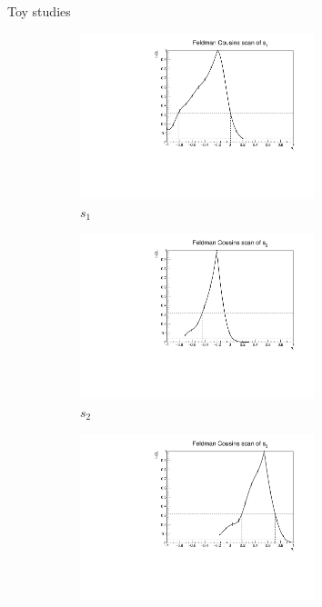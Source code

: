 \documentclass{beamer}
\begin{document}
\begin{frame}{Toy studies}
  \begin{figure}
    \centering
    \begin{subfigure}{0.5\textwidth}
      \centering
      \includegraphics[width=0.75\textwidth]{Plots/Feldman_Cousins_CL_s1.pdf}
      \caption{$s_1$}
    \end{subfigure}%
    \begin{subfigure}{0.5\textwidth}
      \centering
      \includegraphics[width=0.75\textwidth]{Plots/Feldman_Cousins_CL_s2.pdf}
      \caption{$s_2$}
    \end{subfigure}
    \begin{subfigure}{0.5\textwidth}
      \centering
      \includegraphics[width=0.75\textwidth]{Plots/Feldman_Cousins_CL_s3.pdf}

\end{subfigure}
\end{figure}
\end{frame}
\end{document}
